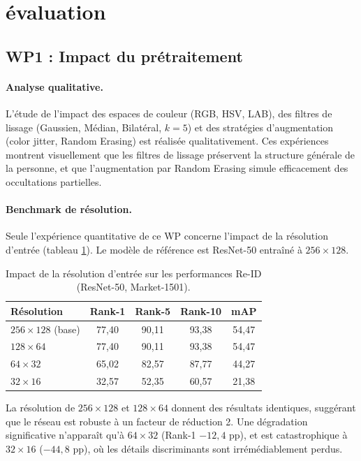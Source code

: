\section{évaluation}
\label{sec:evaluation}

\subsection{WP1 : Impact du prétraitement}

\paragraph{Analyse qualitative.}
L'étude de l'impact des espaces de couleur (RGB, HSV, LAB), des filtres de lissage (Gaussien, Médian, Bilatéral, $k=5$) et des stratégies d'augmentation (color jitter, Random Erasing) est réalisée qualitativement. Ces expériences montrent visuellement que les filtres de lissage préservent la structure générale de la personne, et que l'augmentation par Random Erasing simule efficacement des occultations partielles.

\paragraph{Benchmark de résolution.}
Seule l'expérience quantitative de ce WP concerne l'impact de la résolution d'entrée (tableau \ref{tab:resolution}). Le modèle de référence est ResNet-50 entraîné à $256 \times 128$.

\begin{table}[t]
\centering
\caption{Impact de la résolution d'entrée sur les performances Re-ID (ResNet-50, Market-1501).}
\label{tab:resolution}
\begin{tabular}{lcccc}
\toprule
Résolution & Rank-1 & Rank-5 & Rank-10 & mAP \\
\midrule
$256\times128$ (base) & 77,40 & 90,11 & 93,38 & 54,47 \\
$128\times64$         & 77,40 & 90,11 & 93,38 & 54,47 \\
$64\times32$          & 65,02 & 82,57 & 87,77 & 44,27 \\
$32\times16$          & 32,57 & 52,35 & 60,57 & 21,38 \\
\bottomrule
\end{tabular}
\end{table}

La résolution de $256 \times 128$ et $128 \times 64$ donnent des résultats identiques, suggérant que le réseau est robuste à un facteur de réduction 2. Une dégradation significative n'apparaît qu'à $64 \times 32$ (Rank-1 $-12,4$ pp), et est catastrophique à $32 \times 16$ ($-44,8$ pp), o\`{u} les détails discriminants sont irrémédiablement perdus.

